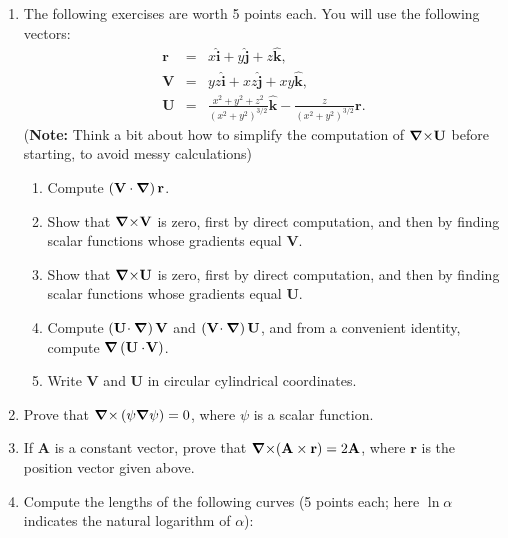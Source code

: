 \documentclass[fleqn]{article}
\newcommand{\grad}[1]{\mbox{\boldmath $\nabla$}\mbox{$#1$}}
\begin{document}
\begin{enumerate}
    
    \item The following exercises are worth 5 points each. You will use the following vectors: 
      \begin{eqnarray*}
      \mathbf{r} &=&x\mathbf{\hat{i}}+y\mathbf{\hat{j}}+z\mathbf{\hat{k},} \\
      \mathbf{V} &=&yz\mathbf{\hat{i}}+xz\mathbf{\hat{j}}+xy\mathbf{\hat{k},} \\
      \mathbf{U} &=&\frac{x^{2}+y^{2}+z^{2}}{\left( x^{2}+y^{2}\right) ^{3/2}}
      \mathbf{\hat{k}-}\frac{z}{\left( x^{2}+y^{2}\right) ^{3/2}}\mathbf{r.}
      \end{eqnarray*}
    ({\bf Note:} Think a bit about how to simplify the computation of
    $\mathbf{\grad \times U}$ before starting, to avoid messy calculations)
    \begin{enumerate}
    \item Compute $\left( \mathbf{V\cdot \grad{}}\right) \mathbf{r}$.
    
    \item Show that $\mathbf{\grad \times V}$ is zero, first by direct computation, and then by finding scalar functions whose gradients equal $\mathbf{V}$.
    
    \item Show that $\mathbf{\grad \times U}$ is zero, first by direct computation, and then by finding scalar functions whose gradients equal $\mathbf{U}$. 
    
    \item Compute $\left( \mathbf{U \! \cdot \grad{} }\right) \mathbf{V}$ and $\left( \mathbf{V \! \cdot \grad{} }\right) \mathbf{U}$, and from a
    convenient identity, compute $\grad{}\left( \mathbf{U\cdot
    \! V}\right) $.
    
    \item Write $\mathbf{V}$ and $\mathbf{U}$ in circular cylindrical
    coordinates.
    \end{enumerate}
    
    \item Prove that $\mathbf{\grad \times }\left( \psi \mathbf{\grad{} }\psi \right) =0$, where $\psi $ is a scalar function.
    
    \item If $\mathbf{A}$ is a constant vector, prove that $\mathbf{\grad \times (A \times r)} =2 \mathbf{A}$, where $\mathbf{r}$ is the position vector given above.
    
    
    \item Compute the lengths of the following curves (5 points each; here $\ln \alpha$ indicates the natural logarithm of $\alpha$): 
    

\end{enumerate}
\end{document}
